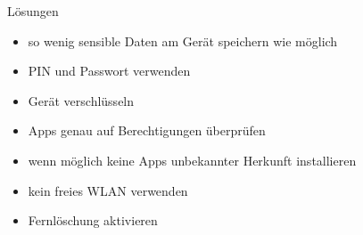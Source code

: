 \begin{frame}[c]
\begin{center}
\end{center}
\end{frame}

\begin{frame}{}
  \begin{center}
  \end{center}
\end{frame}

\begin{frame}{Lösungen}
	\begin{itemize}
		\item<1-> so wenig sensible Daten am Gerät speichern wie möglich
		\item<2-> PIN und Passwort verwenden
		\item<3-> Gerät verschlüsseln
		\item<4-> Apps genau auf Berechtigungen überprüfen
		\item<5-> wenn möglich keine Apps unbekannter Herkunft installieren
		\item<6-> kein freies WLAN verwenden
		\item<7-> Fernlöschung aktivieren
	\end{itemize}
\end{frame}
